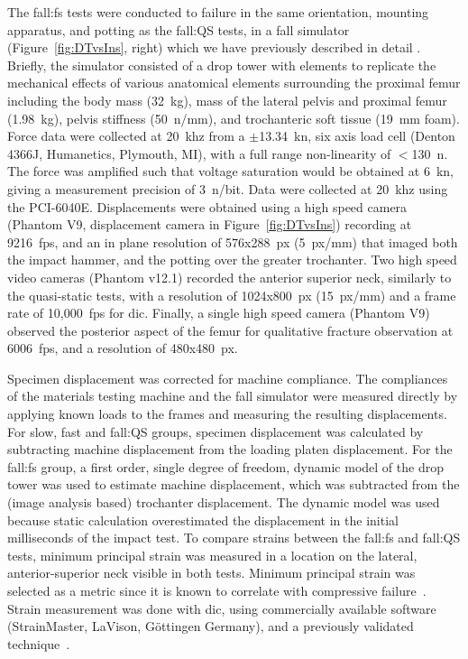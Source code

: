 The fall:\ac{fs} tests were conducted to failure in the same orientation, mounting apparatus, and potting as the fall:\ac{QS} tests, in a fall simulator (Figure~\ref{fig:DTvsIns}, right) which we have previously described in detail \citep{gilchrist_development_2013}.
Briefly, the simulator consisted of a drop tower with elements to replicate the mechanical effects of various anatomical elements surrounding the proximal femur including the body mass (32~\ac{kg}), mass of the lateral pelvis and proximal femur (1.98~\ac{kg}), pelvis stiffness (50~\ac{n}/\ac{mm}), and trochanteric soft tissue (19~\ac{mm} foam).
Force data were collected at 20~\ac{khz} from a $\pm$13.34~\ac{kn}, six axis load cell (Denton 4366J, Humanetics, Plymouth, MI), with a full range non-linearity of $<$130~\ac{n}.
The force was amplified such that voltage saturation would be obtained at 6~\ac{kn}, giving a measurement precision of 3~\ac{n}/bit.
Data were collected at 20~\ac{khz} using the PCI-6040E.
Displacements were obtained using a high speed camera (Phantom V9, displacement camera in Figure~\ref{fig:DTvsIns}) recording at 9216~\ac{fps}, and an in plane resolution of 576x288~\ac{px} (5~\ac{px}/\ac{mm}) that imaged both the impact hammer, and the potting over the greater trochanter.
Two high speed video cameras (Phantom v12.1) recorded the anterior superior neck, similarly to the quasi-static tests, with a resolution of 1024x800~\ac{px} (15~\ac{px}/\ac{mm}) and a frame rate of 10,000~\ac{fps} for \ac{dic}.
Finally, a single high speed camera (Phantom V9) observed the posterior aspect of the femur for qualitative fracture observation at 6006~\ac{fps}, and a resolution of 480x480~\ac{px}.

Specimen displacement was corrected for machine compliance.
The compliances of the materials testing machine and the fall simulator were measured directly by applying known loads to the frames and measuring the resulting displacements.
For slow, fast and fall:\ac{QS} groups, specimen displacement was calculated by subtracting machine displacement from the loading platen displacement. 
For the fall:\ac{fs} group, a first order, single degree of freedom, dynamic model of the drop tower was used to estimate machine displacement, which was subtracted from the (image analysis based) trochanter displacement.
The dynamic model was used because static calculation overestimated the displacement in the initial milliseconds of the impact test.
To compare strains between the fall:\ac{fs} and fall:\ac{QS} tests, minimum principal strain was measured in a location on the lateral, anterior-superior neck visible in both tests.
Minimum principal strain was selected as a metric since it is known to correlate with compressive failure~\citep{bayraktar_comparison_2004}.
Strain measurement was done with \ac{dic}, using commercially available software (StrainMaster, LaVison, G\"{o}ttingen Germany), and a previously validated technique~\citep{gilchrist_development_2013}.


